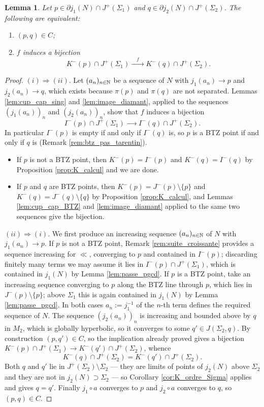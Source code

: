 \documentclass[a4paper,twoside]{article}
\newtheorem{lem}{Lemma}[section]
\begin{document}
\begin{lem}\label{lem:corresponding_K}
Let $p\in \partial j_1(N)\cap J^+(\Sigma_1)$ and $q\in \partial j_2(N)\cap J^+(\Sigma_2)$. The
following are equivalent:
\begin{enumerate}[label=(\roman*)]
\item $(p,q)\in C$;
\item $f$ induces a bijection
$$K^-(p)\cap J^+(\Sigma_1)\xrightarrow{\quad f\quad} K^-(q)\cap J^+(\Sigma_2).$$
\end{enumerate}
\end{lem}
\begin{proof}
$(i)\Rightarrow(ii)$. Let $(a_n)_{n\in \mathbb{N}}$ be a sequence of $N$ with $j_1(a_n)\rightarrow p$ and
$j_2(a_n)\rightarrow q$, which exists because $\pi(p)$ and $\pi(q)$ are not separated. Lemmas
\ref{lem:cup_cap_sing} and \ref{lem:image_diamant}, applied to the sequences $(j_1(a_n))_n$ and
$(j_2(a_n))_n$, show that $f$ induces a bijection
$$I^-(p)\cap J^+(\Sigma_1)\xrightarrow{\quad\quad} I^-(q)\cap J^+(\Sigma_2).$$
In particular $I^-(p)$ is empty if and only if $I^-(q)$ is, so $p$ is a BTZ point if and only if $q$
is (Remark \ref{rem:btz_pas_tarentin}).
\begin{itemize}
\item If $p$ is not a BTZ point, then $K^-(p)=I^-(p)$ and $K^-(q)=I^-(q)$ by Proposition
\ref{prop:K_calcul} and we are done.
\item If $p$ and $q$ are BTZ points, then $K^-(p)=J^-(p)\setminus\{p\}$ and
$K^-(q)=J^-(q)\setminus\{q\}$ by Proposition \ref{prop:K_calcul}, and Lemmas
\ref{lem:cup_cap_BTZ} and \ref{lem:image_diamant} applied to the same two sequences give the
bijection.
\end{itemize}

$(ii)\Rightarrow(i)$. We first produce an increasing sequence $(a_n)_{n\in \mathbb{N}}$ of $N$ with
$j_1(a_n)\rightarrow p$. If $p$ is not a BTZ point, Remark \ref{rem:suite_croissante} provides a
sequence increasing for $\ll$, converging to $p$ and contained in $I^-(p)$; discarding finitely many
terms we may assume it lies in $I^-(p)\cap J^+(\Sigma_1)$, which is contained in $j_1(N)$ by Lemma
\ref{lem:passe_pgcd}. If $p$ is a BTZ point, take an increasing sequence converging to $p$ along the
BTZ line through $p$, which lies in $J^-(p)\setminus\{p\}$; above $\Sigma_1$ this is again contained
in $j_1(N)$ by Lemma \ref{lem:passe_pgcd}. In both cases $a_n:=j_1^{-1}$ of the $n$-th
term defines the required sequence of $N$. The sequence $\left(j_2(a_n)\right)_{n}$ is
increasing and bounded above by $q$ in $M_2$, which is globally hyperbolic, so it converges to some
$q'\in J(\Sigma_2,q)$. By construction $(p,q')\in C$, so the implication already proved gives a
bijection $K^-(p)\cap J^+(\Sigma_1)\rightarrow K^-(q')\cap J^+(\Sigma_2)$, whence
$$K^-(q)\cap J^+(\Sigma_2)=K^-(q')\cap J^+(\Sigma_2).$$
Both $q$ and $q'$ lie in $J^+(\Sigma_2)\setminus \Sigma_2$ --- they are limits of points of
$j_2(N)$ above $\Sigma_2$ and they are not in $j_2(N)\supset \Sigma_2$ --- so Corollary
\ref{cor:K_ordre_Sigma} applies and gives $q=q'$. Finally $j_1\circ a$ converges to
$p$ and $j_2\circ a$ converges to $q$, so $(p,q)\in C$.
\end{proof}
\end{document}
